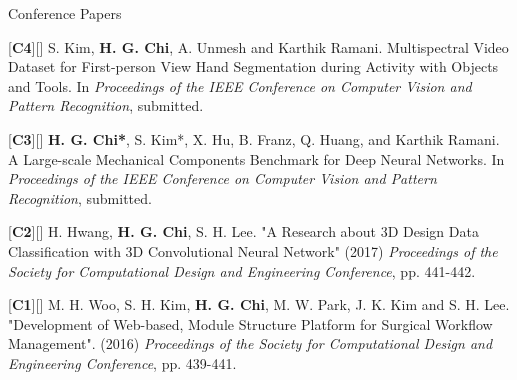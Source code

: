 \begin{cventries}
\cvpub
{Conference Papers} %
{ %
\begin{cvitems}
\item {[\textbf{C4}][\href{https://docs.google.com/viewer?url=https://github.com/stnoah1/CV/raw/master/documents/RGBDT.pdf}{}] S. Kim, \textbf{H. G. Chi}, A. Unmesh and Karthik Ramani. Multispectral Video Dataset for First-person View Hand Segmentation during Activity with Objects and Tools. In \textit{Proceedings of the IEEE Conference on Computer Vision and Pattern Recognition}, submitted.}
\item {[\textbf{C3}][\href{https://docs.google.com/viewer?url=https://github.com/stnoah1/CV/raw/master/documents/MCB.pdf}{}] \textbf{H. G. Chi*}, S. Kim*, X. Hu, B. Franz, Q. Huang, and Karthik Ramani. A Large-scale Mechanical Components Benchmark for Deep Neural Networks. In \textit{Proceedings of the IEEE Conference on Computer Vision and Pattern Recognition}, submitted.}
\item {[\textbf{C2}][\href{https://docs.google.com/viewer?url=https://github.com/stnoah1/CV/raw/master/documents/3DM.pdf}{}] H. Hwang, \textbf{H. G. Chi}, S. H. Lee. "A Research about 3D Design Data Classification with 3D Convolutional Neural Network" (2017) \textit{Proceedings of the Society for Computational Design and Engineering Conference}, pp. 441-442.}
\item {[\textbf{C1}][\href{https://docs.google.com/viewer?url=https://github.com/stnoah1/CV/raw/master/documents/SWORM.pdf}{}] M. H. Woo, S. H. Kim, \textbf{H. G. Chi}, M. W. Park, J. K. Kim and S. H. Lee. "Development of Web-based, Module Structure Platform for Surgical Workflow Management". (2016) \textit{Proceedings of the Society for Computational Design and Engineering Conference}, pp. 439-441.}
\end{cvitems}
}


\end{cventries}